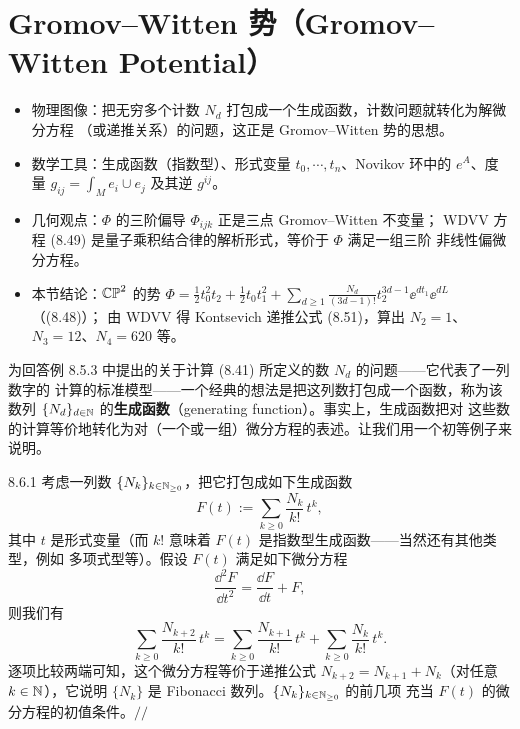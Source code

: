\section{Gromov--Witten 势（Gromov–Witten Potential）}

\begin{keytakeaways}
\begin{itemize}
  \item 物理图像：把无穷多个计数 $N_d$ 打包成一个生成函数，计数问题就转化为解微分方程
        （或递推关系）的问题，这正是 Gromov--Witten 势的思想。
  \item 数学工具：生成函数（指数型）、形式变量 $t_0,\cdots,t_n$、Novikov 环中的
        $e^A$、度量 $g_{ij}=\int_Me_i\cup e_j$ 及其逆 $g^{ij}$。
  \item 几何观点：$\Phi$ 的三阶偏导 $\Phi_{ijk}$ 正是三点 Gromov--Witten 不变量；
        WDVV 方程 (8.49) 是量子乘积结合律的解析形式，等价于 $\Phi$ 满足一组三阶
        非线性偏微分方程。
  \item 本节结论：$\mathbb{CP}^2$ 的势 $\Phi=\frac12t_0^2t_2+\frac12t_0t_1^2+
        \sum_{d\ge1}\frac{N_d}{(3d-1)!}t_2^{3d-1}\ee^{dt_1}\ee^{dL}$（(8.48)）；
        由 WDVV 得 Kontsevich 递推公式 (8.51)，算出 $N_2=1$、$N_3=12$、$N_4=620$ 等。
\end{itemize}
\end{keytakeaways}

为回答例 8.5.3 中提出的关于计算 (8.41) 所定义的数 $N_d$ 的问题——它代表了一列数字的
计算的标准模型——一个经典的想法是把这列数打包成一个函数，称为该数列
$\{N_d\}_{d\in\mathbb{N}}$ 的\textbf{生成函数}（generating function）。事实上，生成函数把对
这些数的计算等价地转化为对（一个或一组）微分方程的表述。让我们用一个初等例子来说明。

\begin{wexam}{8.6.1}
考虑一列数 $\{N_k\}_{k\in\mathbb{N}_{\ge0}}$，把它打包成如下生成函数
\[
  F(t):=\sum_{k\ge0}\frac{N_k}{k!}\,t^k,
\]
其中 $t$ 是形式变量（而 $k!$ 意味着 $F(t)$ 是指数型生成函数——当然还有其他类型，例如
多项式型等）。假设 $F(t)$ 满足如下微分方程
\[
  \frac{\dd^2F}{\dd t^2}=\frac{\dd F}{\dd t}+F,
\]
则我们有
\[
  \sum_{k\ge0}\frac{N_{k+2}}{k!}\,t^k
  =\sum_{k\ge0}\frac{N_{k+1}}{k!}\,t^k+\sum_{k\ge0}\frac{N_k}{k!}\,t^k .
\]
逐项比较两端可知，这个微分方程等价于递推公式 $N_{k+2}=N_{k+1}+N_k$（对任意
$k\in\mathbb{N}$），它说明 $\{N_k\}$ 是 Fibonacci 数列。$\{N_k\}_{k\in\mathbb{N}_{\ge0}}$ 的前几项
充当 $F(t)$ 的微分方程的初值条件。\hspace*{\fill}$//$
\end{wexam}

